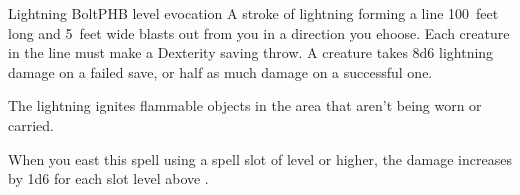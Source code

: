 \begin{spell}{Lightning Bolt}{PHB}{ level evocation}
{
}
A stroke of lightning forming a line 100~feet long and
5~feet wide blasts out from you in a direction you ehoose.
Each creature in the line must make a Dexterity saving
throw. A creature takes 8d6 lightning damage on a
failed save, or half as much damage on a successful one.

The lightning ignites flammable objects in the area
that aren't being worn or carried.

 When you east this spell using a
spell slot of  level or higher, the damage increases by
1d6 for each slot level above .
\end{spell}